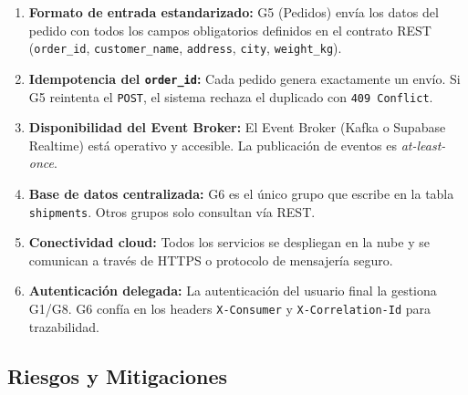\documentclass[11pt, a4paper]{article}
\begin{document}
\begin{enumerate}[noitemsep]
  \item \textbf{Formato de entrada estandarizado:} G5 (Pedidos) envía los datos del pedido con todos los campos obligatorios definidos en el contrato REST (\texttt{order\_id}, \texttt{customer\_name}, \texttt{address}, \texttt{city}, \texttt{weight\_kg}).
  \item \textbf{Idempotencia del \texttt{order\_id}:} Cada pedido genera exactamente un envío. Si G5 reintenta el \texttt{POST}, el sistema rechaza el duplicado con \texttt{409 Conflict}.
  \item \textbf{Disponibilidad del Event Broker:} El Event Broker (Kafka o Supabase Realtime) está operativo y accesible. La publicación de eventos es \emph{at-least-once}.
  \item \textbf{Base de datos centralizada:} G6 es el único grupo que escribe en la tabla \texttt{shipments}. Otros grupos solo consultan vía REST.
  \item \textbf{Conectividad cloud:} Todos los servicios se despliegan en la nube y se comunican a través de HTTPS o protocolo de mensajería seguro.
  \item \textbf{Autenticación delegada:} La autenticación del usuario final la gestiona G1/G8. G6 confía en los headers \texttt{X-Consumer} y \texttt{X-Correlation-Id} para trazabilidad.
\end{enumerate}

\subsection{Riesgos y Mitigaciones}
\end{document}
